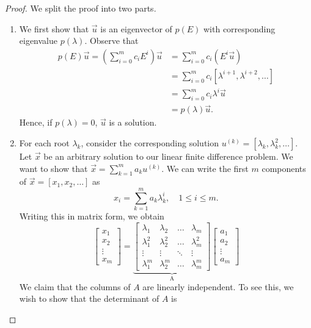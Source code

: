 \documentclass[12pt,reqno]{amsart}
\numberwithin{equation}{section}  %
\begin{document}
\begin{proof} We split the proof into two parts.
\begin{enumerate}
  \item 
  We first show that $\vec{u}$ is an eigenvector of $p(E)$ with corresponding
  eigenvalue $p(\lambda)$. Observe that
  \begin{align*}
p(E) \vec{u} = \left(\sum_{i=0}^m c_i E^i \right) \vec{u}
& = \sum_{ i = 0}^m c_i \left( E^i \vec{u}\right)
\\
& = \sum_{i = 0}^m c_i [\lambda^{i+1}, \lambda^{i+2}, \ldots]
\\
& = \sum_{i = 0}^m c_i \lambda^i \vec{u}
\\
& = p(\lambda) \vec{u}.	 
\end{align*}
Hence, if $p(\lambda) = 0$, $\vec{u}$ is a solution.
\item
\label{simple}
For each root $\lambda_k$, consider the corresponding solution $u^{(k)} =
[\lambda_k, \lambda_k^2, \ldots]$. Let $\vec{x}$ be an arbitrary solution to our
linear finite difference problem. We want to show that $\vec{x} = \sum_{k=1}^m
a_k u^{(k)}$. We can write
the first $m$ components of $\vec{x} = [x_1, x_2, \ldots]$ as 
\begin{equation}
\label{det}
x_i = \sum_{k=1}^{m} a_k \lambda_k^i, \quad 1 \le i \le m.
\end{equation}
Writing this in matrix form, we obtain
\begin{equation*}
\begin{bmatrix}
x_1 \\ x_2 \\ \vdots \\ x_m
\end{bmatrix}
= 
\underbrace{
\begin{bmatrix}
\lambda_1 & \lambda_2 & \ldots & \lambda_m \\
\lambda_1^2 & \lambda_2^2 & \ldots & \lambda_m^2 \\
\vdots & \vdots & \ddots & \vdots \\
\lambda_1^m & \lambda_2^m & \ldots & \lambda_m^m 
\end{bmatrix}
}_\text{A}
\begin{bmatrix}
a_1 \\ a_2 \\ \vdots \\ a_m
\end{bmatrix}
\end{equation*}
We claim that the columns of $A$ are linearly
independent. To see this, we wish to show that the determinant of $A$ is

\end{enumerate}
\end{proof}
\end{document}
